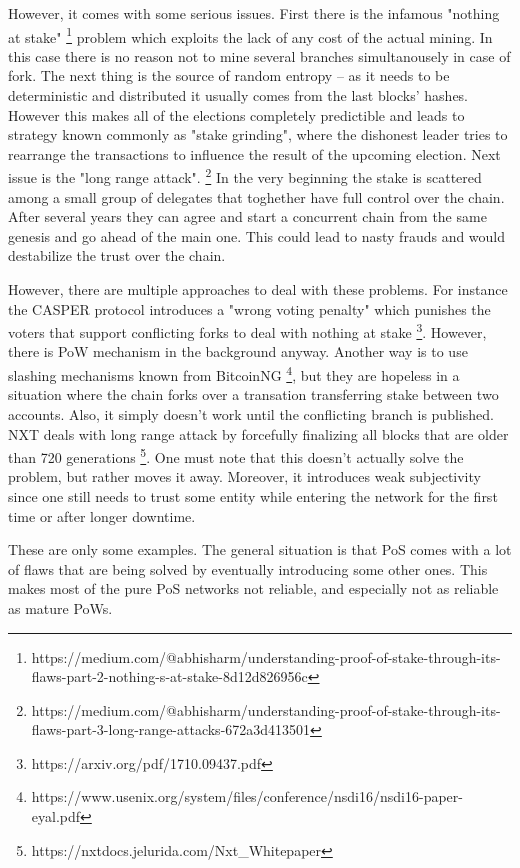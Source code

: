 However, it comes with some serious issues. First there is the infamous "nothing at stake"
\footnote{https://medium.com/@abhisharm/understanding-proof-of-stake-through-its-flaws-part-2-nothing-s-at-stake-8d12d826956c}
problem which exploits the lack of any cost of the actual mining. In this case
there is no reason not to mine several branches simultanousely in case of fork.
The next thing is the source of random entropy – as it needs to be deterministic
and distributed it usually comes from the last blocks' hashes. However this
makes all of the elections completely predictible and leads to strategy known
commonly as "stake grinding", where the dishonest leader tries to rearrange the
transactions to influence the result of the upcoming election. Next issue is the
"long range attack".
\footnote{https://medium.com/@abhisharm/understanding-proof-of-stake-through-its-flaws-part-3-long-range-attacks-672a3d413501}
In the very beginning the stake is scattered among a small
group of delegates that toghether have full control over the chain. After
several years they can agree and start a concurrent chain from the same genesis
and go ahead of the main one. This could lead to nasty frauds and would
destabilize the trust over the chain.

However, there are multiple approaches to deal with these problems. For instance
the CASPER protocol introduces a "wrong voting penalty" which punishes the
voters that support conflicting forks to deal with nothing at stake
\footnote{https://arxiv.org/pdf/1710.09437.pdf}.
However, there is PoW mechanism in the background anyway. Another way is to use
slashing mechanisms known from BitcoinNG
\footnote{https://www.usenix.org/system/files/conference/nsdi16/nsdi16-paper-eyal.pdf},
but they are hopeless in a situation where the chain forks over a transation
transferring stake between two accounts. Also, it simply doesn't work until the
conflicting branch is published. NXT deals with long range attack by forcefully
finalizing all blocks that are older than 720 generations
\footnote{https://nxtdocs.jelurida.com/Nxt_Whitepaper}.
One must note that this doesn't actually solve the problem, but rather moves it
away. Moreover, it introduces weak subjectivity since one still needs to trust
some entity while entering the network for the first time or after longer downtime.

These are only some examples. The general situation is that PoS comes with a lot
of flaws that are being solved by eventually introducing some other ones. This
makes most of the pure PoS networks not reliable, and especially not as reliable
as mature PoWs.